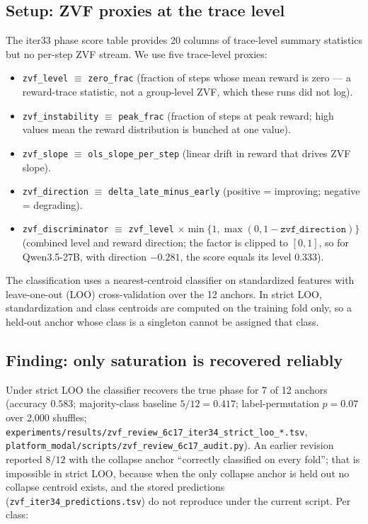 \subsection{Setup: ZVF proxies at the trace level}
\label{sec:zvf-iter34-setup}

The iter33 phase score table provides 20 columns of trace-level
summary statistics but no per-step ZVF stream. We use five trace-level
proxies:

\begin{itemize}
\item \texttt{zvf\_level} $\equiv$ \texttt{zero\_frac} (fraction
of steps whose mean reward is zero --- a reward-trace statistic, not a
group-level ZVF, which these runs did not log).
\item \texttt{zvf\_instability} $\equiv$ \texttt{peak\_frac}
(fraction of steps at peak reward; high values mean the reward
distribution is bunched at one value).
\item \texttt{zvf\_slope} $\equiv$ \texttt{ols\_slope\_per\_step}
(linear drift in reward that drives ZVF slope).
\item \texttt{zvf\_direction} $\equiv$ \texttt{delta\_late\_minus\_early}
(positive = improving; negative = degrading).
\item \texttt{zvf\_discriminator} $\equiv$
\texttt{zvf\_level} $\times \min\{1,\max(0, 1 - \texttt{zvf\_direction})\}$
(combined level and reward direction; the factor is clipped to $[0,1]$, so
for Qwen3.5-27B, with direction $-0.281$, the score equals its level $0.333$).
\end{itemize}

The classification uses a nearest-centroid classifier on standardized
features with leave-one-out (LOO) cross-validation over the 12 anchors.
In strict LOO, standardization and class centroids are computed on the
training fold only, so a held-out anchor whose class is a singleton cannot
be assigned that class.

\subsection{Finding: only saturation is recovered reliably}
\label{sec:zvf-iter34-finding}

Under strict LOO the classifier recovers the true phase for 7 of 12 anchors
(accuracy $0.583$; majority-class baseline $5/12=0.417$; label-permutation
$p=0.07$ over 2,000 shuffles;
\texttt{experiments/results/zvf\_review\_6c17\_iter34\_strict\_loo\_*.tsv},
\texttt{platform\_modal/scripts/zvf\_review\_6c17\_audit.py}). An earlier
revision reported $8/12$ with the collapse anchor ``correctly classified on
every fold''; that is impossible in strict LOO, because when the only collapse
anchor is held out no collapse centroid exists, and the stored predictions
(\texttt{zvf\_iter34\_predictions.tsv}) do not reproduce under the current
script. Per class:

